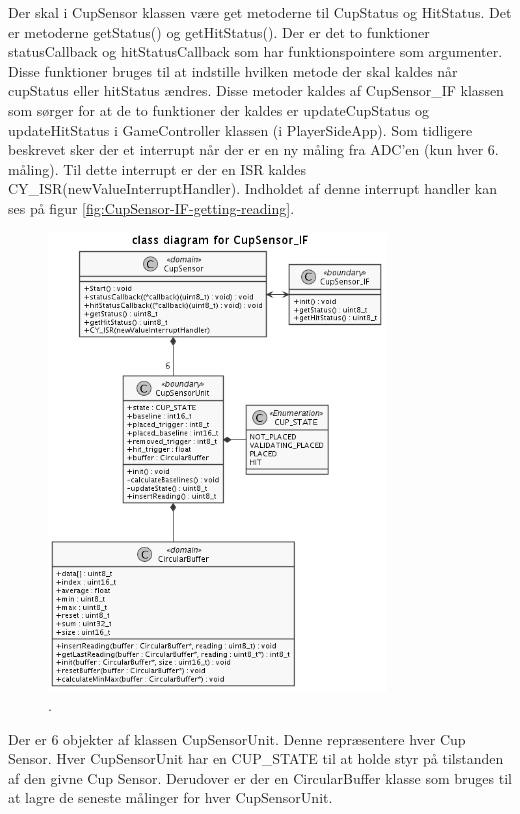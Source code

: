 \documentclass[Softwaredesign/Softwaredesign_main.tex]{subfiles}
\begin{document}
Der skal i CupSensor klassen være get metoderne til CupStatus og HitStatus. Det er metoderne getStatus() og getHitStatus(). Der er det to funktioner statusCallback og hitStatusCallback som har funktionspointere som argumenter. Disse funktioner bruges til at indstille hvilken metode der skal kaldes når cupStatus eller hitStatus ændres. Disse metoder kaldes af CupSensor\_IF klassen som sørger for at de to funktioner der kaldes er updateCupStatus og updateHitStatus i GameController klassen (i PlayerSideApp).
Som tidligere beskrevet sker der et interrupt når der er en ny måling fra ADC'en (kun hver 6. måling). Til dette interrupt er der en ISR kaldes CY\_ISR(newValueInterruptHandler). Indholdet af denne interrupt handler kan ses på figur \ref{fig:CupSensor-IF-getting-reading}. 
 
\begin{figure}[H]
    \centering
    \includegraphics[width=0.8\textwidth]{Softwaredesign/CupSensor_IF/graphics/classDiagram.png}
    \caption{.}
    \label{fig:CupSensor-IF-classDiagram}
\end{figure}

Der er 6 objekter af klassen CupSensorUnit. Denne repræsentere hver Cup Sensor. Hver CupSensorUnit har en CUP\_STATE til at holde styr på tilstanden af den givne Cup Sensor. Derudover er der en CircularBuffer klasse som bruges til at lagre de seneste målinger for hver CupSensorUnit.
\end{document}
